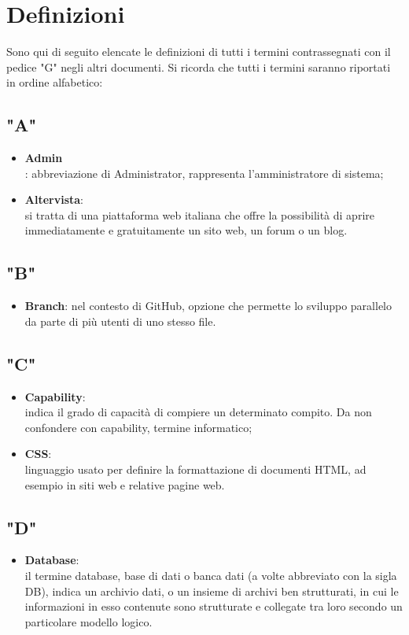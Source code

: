 
\section{Definizioni}
Sono qui di seguito elencate le definizioni di tutti i termini contrassegnati con il pedice "G" negli altri documenti.
Si ricorda che tutti i termini saranno riportati in ordine alfabetico:

\subsection{"A"}
\begin{itemize}
\item \textbf{Admin}\\: abbreviazione di Administrator, rappresenta l'amministratore di sistema;
\item \textbf{Altervista}:\\ si tratta di una piattaforma web italiana che offre la possibilità di aprire immediatamente e gratuitamente un sito web, un forum o un blog.
\end{itemize}
\subsection{"B"}
\begin{itemize}
\item \textbf{Branch}: nel contesto di GitHub, opzione che permette lo sviluppo parallelo da parte di più utenti di uno stesso file.
\end{itemize}
\subsection{"C"}
\begin{itemize}
\item \textbf{Capability}:\\ indica il grado di capacità di compiere un determinato compito. Da non confondere con capability, termine informatico;
\item \textbf{CSS}:\\ linguaggio usato per definire la formattazione di documenti HTML, ad esempio in siti web e relative pagine web.
\end{itemize}

\subsection{"D"}
\begin{itemize}
\item \textbf{Database}:\\ il termine database, base di dati o banca dati (a volte abbreviato con la sigla DB), indica un archivio dati, o un insieme di archivi ben strutturati, in cui le informazioni in esso contenute sono strutturate e collegate tra loro secondo un particolare modello logico.
\end{itemize}

